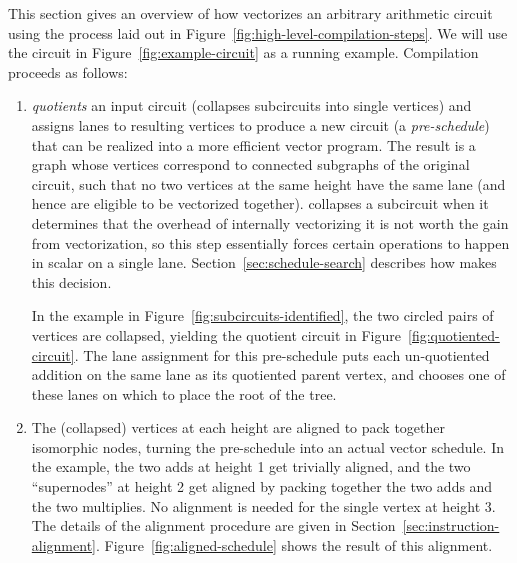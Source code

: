 This section gives an overview of how \system vectorizes an arbitrary arithmetic circuit using the process laid out in Figure~\ref{fig:high-level-compilation-steps}.
We will use the circuit in Figure~\ref{fig:example-circuit} as a running example.
Compilation proceeds as follows:
\begin{enumerate}
    \item \system \textit{quotients} an input circuit (collapses subcircuits into single vertices) and assigns lanes to resulting vertices to produce a new circuit (a {\em pre-schedule}) that can be realized into a more efficient vector program. The result is a graph whose vertices correspond to connected subgraphs of the original circuit, such that no two vertices at the same height have the same lane (and hence are eligible to be vectorized together). \system collapses a subcircuit when it determines that the overhead of internally vectorizing it is not worth the gain from vectorization, so this step essentially forces certain operations to happen in scalar on a single lane. %
    Section~\ref{sec:schedule-search} describes how \system makes this decision. 
    
    In the example in Figure~\ref{fig:subcircuits-identified}, the two circled pairs of vertices are collapsed, yielding the quotient circuit in Figure~\ref{fig:quotiented-circuit}.
    The lane assignment for this pre-schedule puts each un-quotiented addition on the same lane as its quotiented parent vertex, and chooses one of these lanes on which to place the root of the tree.
    
    
    \item The (collapsed) vertices at each height are aligned to pack together isomorphic nodes, turning the pre-schedule into an actual vector schedule. 
    In the example, the two adds at height 1 get trivially aligned, and the two ``supernodes'' at height 2 get aligned by packing together the two adds and the two multiplies.
    No alignment is needed for the single vertex at height 3.
    The details of the alignment procedure are given in Section~\ref{sec:instruction-alignment}.
    Figure~\ref{fig:aligned-schedule} shows the result of this alignment.
    

\end{enumerate}
